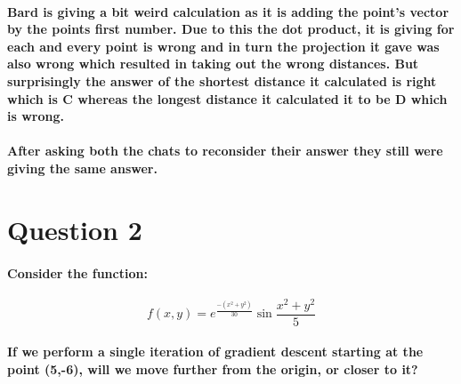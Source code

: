 \documentclass[11pt]{article} %
\begin{document}
\paragraph{\textbf{Bard} is giving a bit weird calculation as it is adding the point’s vector by the points first 
number. Due to this the dot product, it is giving for each and every point is wrong and in 
turn the projection it gave was also wrong which resulted in taking out the wrong distances. 
But surprisingly the answer of the shortest distance it calculated is right which is C whereas 
the longest distance it calculated it to be D which is wrong.}

\paragraph{After asking both the chats to reconsider their answer they still were giving the same answer.}


% 
% 
% 
% 
% 
% 
% 
% 
% 
% 
% 
% 
% 
% 
% 
% 
% 
% 
% 
% 
% 
% 
% 
% 
% 
% 
% 
% 
\newpage
\section{Question 2}
\paragraph{Consider the function: }
$$ f(x,y)=e^{\frac{-(x^2+y^2)}{30}} \sin \frac{x^2+y^2}{5} $$
\paragraph{If we perform a single iteration of gradient descent starting at the point (5,-6), will we move further from the origin, or closer to it?}
% 
% 
% 
% 
% 
% 
% 
% 
% 
% 
\end{document}
